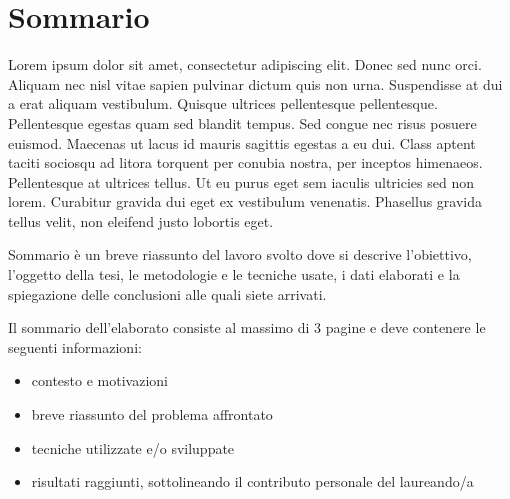 \chapter*{Sommario} %
\label{sommario}


Lorem ipsum dolor sit amet, consectetur adipiscing elit. Donec sed nunc orci. Aliquam nec nisl vitae sapien pulvinar dictum quis non urna. Suspendisse at dui a erat aliquam vestibulum. Quisque ultrices pellentesque pellentesque. Pellentesque egestas quam sed blandit tempus. Sed congue nec risus posuere euismod. Maecenas ut lacus id mauris sagittis egestas a eu dui. Class aptent taciti sociosqu ad litora torquent per conubia nostra, per inceptos himenaeos. Pellentesque at ultrices tellus. Ut eu purus eget sem iaculis ultricies sed non lorem. Curabitur gravida dui eget ex vestibulum venenatis. Phasellus gravida tellus velit, non eleifend justo lobortis eget.


  Sommario è un breve riassunto del lavoro svolto dove si descrive l'obiettivo, l'oggetto della tesi, le 
metodologie e le tecniche usate, i dati elaborati e la spiegazione delle conclusioni alle quali siete arrivati.  

Il sommario dell'elaborato consiste al massimo di 3 pagine e deve contenere le seguenti informazioni:
\begin{itemize}
  \item contesto e motivazioni 
  \item breve riassunto del problema affrontato
  \item tecniche utilizzate e/o sviluppate
  \item risultati raggiunti, sottolineando il contributo personale del laureando/a
\end{itemize}





